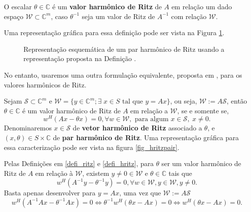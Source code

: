 \begin{defi}\label{defi_hritz}
  O escalar $\theta\in\mathbb{C}$ é um \textbf{valor harmônico de Ritz} de $A$ em relação um dado espaço $\mathcal{W}\subset \mathbb{C}^m$, caso $\theta^{-1}$ seja um valor de Ritz de $A^{-1}$  com relação $\mathcal{W}$.
\end{defi}
Uma representação gráfica para essa definição pode ser vista na Figura \ref{fig_hritzpairorig}.
\begin{figure}[htb]
  \caption{Representação esquemática de um par harmônico de Ritz usando a representação proposta na Definição \protect{\ref{defi_hritz}}.}\label{fig_hritzpairorig}
\end{figure}
No entanto, usaremos uma outra formulação equivalente, proposta em \cite{SleijpenVorst00JacobiDavidson}, para os valores harmônicos de Ritz.
\begin{teore}\label{teo_SleijpenVorst00JacobiDavidson}
Sejam $\mathcal{S}\subset \mathbb{C}^m$ e $\mathcal{W}=\{y\in\mathbb{C}^{m};\exists\; x\in S\text{ tal que } y=Ax\}$, ou seja, $\mathcal{W}:=A\mathcal{S}$, então  $\theta\in\mathbb{C}$ é um valor harmônico de Ritz de $A$ em relação a $\mathcal{W}$,  se e somente se,
\begin{equation}\label{eq_hritz}
 w^H(Ax - \theta x) = 0, \forall w \in \mathcal{W},\text{ para algum  }   x\in \mathcal{S},\;x\neq 0.
\end{equation}
Denominaremos $x\in \mathcal{S}$ de \textbf{vetor harmônico de Ritz} associado a $\theta$, e $(x,\theta)\in S\times \mathbb{C}$ de \textbf{par harmônico de Ritz}.  Uma representação gráfica para essa caracterização pode ser vista na figura \ref{fig_hritzpair}.
\end{teore}
\dem
Pelas Definiç\~{o}es em \ref{defi_ritz} e \ref{defi_hritz}, para $\theta$ ser um valor harmônico de Ritz de $A$ em relação à $\mathcal{W}$, existem $y\ne0 \in \mathcal{W}$ e $\theta\in \mathbb{C}$ tais que
\[
 w^H(A^{-1}y - \theta^{-1} y) = 0, \forall w \in \mathcal{W}, y\in\mathcal{W}, y\ne 0.
\]
Basta apenas desenvolver para $y=Ax$, uma vez que  $\mathcal{W}:=A\mathcal{S}$
\[
 w^H(A^{-1}Ax - \theta^{-1} Ax) = 0\Leftrightarrow \theta^{-1}w^H(\theta x - Ax) = 0\Leftrightarrow w^H(\theta x - Ax) = 0.
\]
\fim

